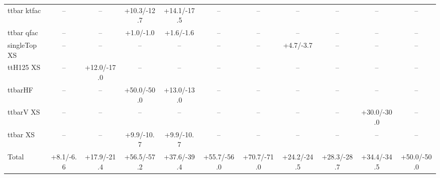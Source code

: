 \begin{tabular}{l*{10}{c}}
$$ttbar ktfac & -- & -- & +10.3/-12.7 & +14.1/-17.5 & -- & -- & -- & -- & -- & --\\
ttbar qfac & -- & -- & +1.0/-1.0 & +1.6/-1.6 & -- & -- & -- & -- & -- & --\\
singleTop XS & -- & -- & -- & -- & -- & -- & +4.7/-3.7 & -- & -- & --\\
ttH125 XS & -- & +12.0/-17.0 & -- & -- & -- & -- & -- & -- & -- & --\\
ttbarHF & -- & -- & +50.0/-50.0 & +13.0/-13.0 & -- & -- & -- & -- & -- & --\\
ttbarV XS & -- & -- & -- & -- & -- & -- & -- & -- & +30.0/-30.0 & --\\
ttbar XS & -- & -- & +9.9/-10.7 & +9.9/-10.7 & -- & -- & -- & -- & -- & --\\
\hline
Total & +8.1/-6.6 & +17.9/-21.4 & +56.5/-57.2 & +37.6/-39.4 & +55.7/-56.0 & +70.7/-71.0 & +24.2/-24.5 & +28.3/-28.7 & +34.4/-34.5 & +50.0/-50.0\\
\hline\hline
\end{tabular}
